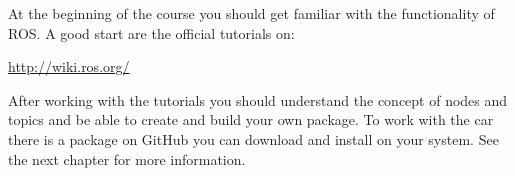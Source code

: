  At the beginning of the course you should get familiar with the functionality of ROS. A good start are the official tutorials on: 

\hyperref[http://wiki.ros.org/]{http://wiki.ros.org/}

After working with the tutorials you should understand the concept of nodes and topics and be able to create and build your own package. To work with the car there is a package on GitHub you can download and install on your system. See the next chapter for more information.





